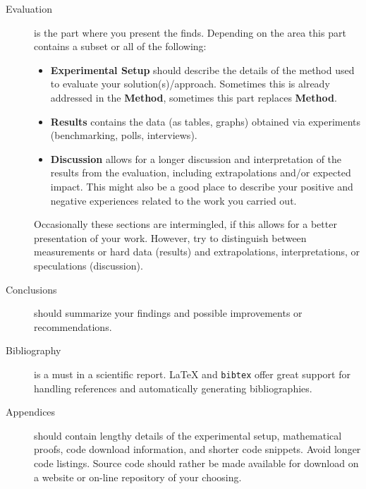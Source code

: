 \documentclass{cslthse-msc}
\begin{document}
\begin{description}
\begin{itemize}
\end{itemize}
\item[Evaluation] is the part where you present the finds. Depending on the area this part contains a subset or all of the following: 
\begin{itemize}
\item \textbf{Experimental Setup} should describe the details of the method used to evaluate your solution(s)/approach. Sometimes this is already addressed in the \textbf{Method}, sometimes this part replaces \textbf{Method}.
\item \textbf{Results} contains the data (as tables, graphs) obtained via experiments (benchmarking, polls, interviews).
\item \textbf{Discussion} allows for a longer discussion and interpretation of the results from the evaluation, including extrapolations and/or expected impact. This might also be a good place to describe your positive and negative experiences related to the work you carried out.
\end{itemize} 
Occasionally these sections are intermingled, if this allows for a better presentation of your work. However, try to distinguish between measurements or hard data (results) and extrapolations, interpretations, or speculations (discussion).
\item[Conclusions] should summarize your findings and possible improvements or recommendations.
\item[Bibliography] is a must in a scientific report. {\LaTeX} and \texttt{bibtex} offer great support for handling references and automatically generating bibliographies.
\item[Appendices] should contain lengthy details of the experimental setup, mathematical proofs, code download information, and shorter code snippets. Avoid longer code listings. Source code should rather be made available for download on a website or on-line repository of your choosing.

\end{description}
\end{document}
